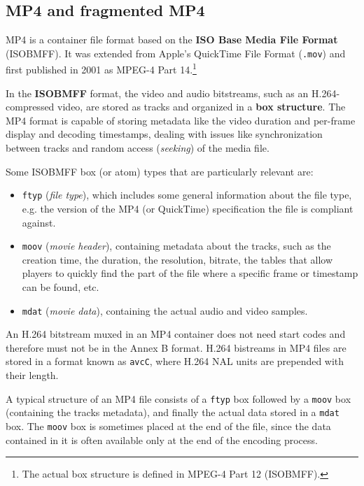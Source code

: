 \subsection{MP4 and fragmented MP4}
\label{sec:bg/containers/mp4}

MP4 is a container file format based on the \textbf{ISO Base Media File Format} (ISOBMFF). It was extended from Apple's QuickTime File Format (\texttt{.mov}) and first published in 2001 as MPEG-4 Part 14.\footnote{The actual box structure is defined in MPEG-4 Part 12 (ISOBMFF).}\cite{mpeg4part12}

In the \textbf{ISOBMFF} format, the video and audio bitstreams, such as an H.264-compressed video, are stored as tracks and organized in a \textbf{box structure}. The MP4 format is capable of storing metadata like the video duration and per-frame display and decoding timestamps, dealing with issues like synchronization between tracks and random access (\textit{seeking}) of the media file.


Some ISOBMFF box (or atom) types that are particularly relevant are:

\begin{itemize}
    \item \texttt{ftyp} (\textit{file type}), which includes some general information about the file type, e.g. the version of the MP4 (or QuickTime) specification the file is compliant against.
    \item \texttt{moov} (\textit{movie header}), containing metadata about the tracks, such as the creation time, the duration, the resolution, bitrate, the tables that allow players to quickly find the part of the file where a specific frame or timestamp can be found, etc.
    \item \texttt{mdat} (\textit{movie data}), containing the actual audio and video samples.
\end{itemize}

An H.264 bitstream muxed in an MP4 container does not need start codes and therefore must not be in the Annex B format. H.264 bistreams in MP4 files are stored in a format known as \texttt{avcC}, where H.264 NAL units are prepended with their length.

A typical structure of an MP4 file consists of a \texttt{ftyp} box followed by a \texttt{moov} box (containing the tracks metadata), and finally the actual data stored in a \texttt{mdat} box. The \texttt{moov} box is sometimes placed at the end of the file, since the data contained in it is often available only at the end of the encoding process.

